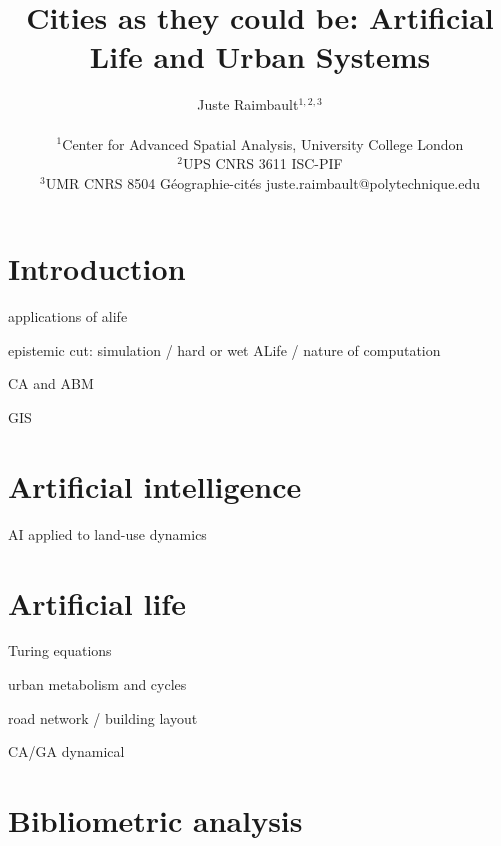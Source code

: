 \documentclass[letterpaper]{article}
\title{Cities as they could be: Artificial Life and Urban Systems}
\author{Juste Raimbault$^{1,2,3}$\\
\mbox{}\\
$^1$Center for Advanced Spatial Analysis, University College London\\
$^2$UPS CNRS 3611 ISC-PIF\\
$^3$UMR CNRS 8504 G{\'e}ographie-cit{\'e}s
juste.raimbault@polytechnique.edu} %
\begin{document}
\maketitle

\begin{abstract}
  
\end{abstract}

\section{Introduction}


\cite{batty2009centenary} %

\cite{kim2006comprehensive} applications of alife


\cite{pattee1995artificial} epistemic cut: simulation / hard or wet ALife / nature of computation


\cite{torrens2003automata} CA and ABM

\cite{openshaw1995developing} GIS




\section{Artificial intelligence}


\cite{wu2010artificial} AI applied to land-use dynamics

\cite{white1989artificial}


\section{Artificial life}

\cite{medda2009morphogenetic} Turing equations

\cite{olsen1982urban} urban metabolism and cycles

\cite{kato1998alife} road network / building layout

\cite{kato2000modeling} CA/GA dynamical


\section{Bibliometric analysis}
\end{document}
